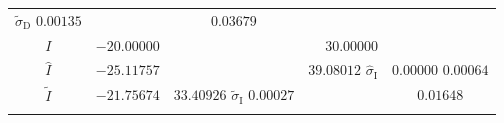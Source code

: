 \documentclass[journal abbreviation, npg]{copernicus}
\providecommand{\DIFadd}[1]{{\protect\color{blue}\uwave{#1}}} %
\providecommand{\DIFdel}[1]{{\protect\color{red}\sout{#1}}}                      %
\providecommand{\DIFaddbegin}{} %
\providecommand{\DIFaddFL}[1]{\DIFadd{#1}} %
\providecommand{\DIFdelFL}[1]{\DIFdel{#1}} %
\providecommand{\DIFaddbeginFL}{} %
\providecommand{\DIFaddendFL}{} %
\providecommand{\DIFdelbeginFL}{} %
\providecommand{\DIFdelendFL}{} %
\begin{document}
\begin{table}[t]
\begin{tabular}{crcrc}
\DIFdelFL{$\tilde{\sigma}_\mathrm{D}$ }%
\DIFdelendFL \DIFaddbeginFL \DIFaddFL{(}\DIFaddendFL $0.00135$\DIFaddbeginFL \DIFaddFL{) }\DIFaddendFL &\DIFaddbeginFL \DIFaddFL{$-39.37397$ }&\DIFaddFL{(}\DIFaddendFL $0.03679$\DIFaddbeginFL \DIFaddFL{) }\DIFaddendFL \\
\DIFaddbeginFL \middlehline
\DIFaddendFL $I$ &$-20.00000$ & \DIFaddbeginFL \DIFaddFL{-- }&\DIFaddendFL $30.00000$ \DIFaddbeginFL & \DIFaddFL{-- }\DIFaddendFL \\
$\hat{I}$ &$-25.11757$ &\DIFaddbeginFL \DIFaddFL{($0.00001$) }&\DIFaddendFL $39.08012$  \DIFdelbeginFL %
\DIFdelFL{$\hat{\sigma}_\mathrm{I}$ }\DIFdelendFL &\DIFdelbeginFL \DIFdelFL{$0.00000$ }%
\DIFdelendFL \DIFaddbeginFL \DIFaddFL{(}\DIFaddendFL $0.00064$\DIFaddbeginFL \DIFaddFL{) }\DIFaddendFL \\
$\tilde{I}$ &$-21.75674$ &\DIFdelbeginFL \DIFdelFL{$33.40926$ }%
\DIFdelFL{$\tilde{\sigma}_\mathrm{I}$ }%
\DIFdelendFL \DIFaddbeginFL \DIFaddFL{(}\DIFaddendFL $0.00027$\DIFaddbeginFL \DIFaddFL{) }\DIFaddendFL &\DIFaddbeginFL \DIFaddFL{$33.40926$ }&\DIFaddFL{(}\DIFaddendFL $0.01648$\DIFaddbeginFL \DIFaddFL{) }\DIFaddendFL \\
\bottomhline
\end{tabular}
\label{tab:synt1-with-inter-anomaly}
\end{table}

\DIFaddbegin 
\end{document}
